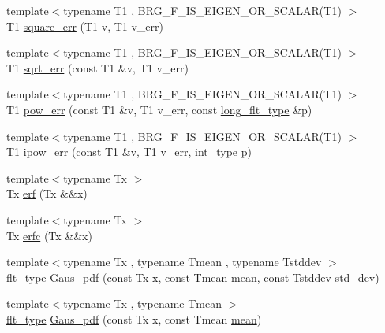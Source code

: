 \begin{DoxyCompactItemize}
{\footnotesize template$<$typename T1 , B\+R\+G\+\_\+\+F\+\_\+\+I\+S\+\_\+\+E\+I\+G\+E\+N\+\_\+\+O\+R\+\_\+\+S\+C\+A\+L\+A\+R(\+T1) $>$ }\\T1 \hyperlink{namespaceIceBRG_ae39a991d56ebe65d206807140a5389b4}{square\+\_\+err} (T1 v, T1 v\+\_\+err)
\item 
{\footnotesize template$<$typename T1 , B\+R\+G\+\_\+\+F\+\_\+\+I\+S\+\_\+\+E\+I\+G\+E\+N\+\_\+\+O\+R\+\_\+\+S\+C\+A\+L\+A\+R(\+T1) $>$ }\\T1 \hyperlink{namespaceIceBRG_a2f0a4e4c33a8437fab257f602f5f9b03}{sqrt\+\_\+err} (const T1 \&v, T1 v\+\_\+err)
\item 
{\footnotesize template$<$typename T1 , B\+R\+G\+\_\+\+F\+\_\+\+I\+S\+\_\+\+E\+I\+G\+E\+N\+\_\+\+O\+R\+\_\+\+S\+C\+A\+L\+A\+R(\+T1) $>$ }\\T1 \hyperlink{namespaceIceBRG_a2de650b0f4e004fd68bbba6414369d6a}{pow\+\_\+err} (const T1 \&v, T1 v\+\_\+err, const \hyperlink{lib_2IceBRG__main_2common_8h_a7040956e7e1b504d34a9ccfb4253bdce}{long\+\_\+flt\+\_\+type} \&p)
\item 
{\footnotesize template$<$typename T1 , B\+R\+G\+\_\+\+F\+\_\+\+I\+S\+\_\+\+E\+I\+G\+E\+N\+\_\+\+O\+R\+\_\+\+S\+C\+A\+L\+A\+R(\+T1) $>$ }\\T1 \hyperlink{namespaceIceBRG_a9c1dffeb9bad10147701507dcb91faf5}{ipow\+\_\+err} (const T1 \&v, T1 v\+\_\+err, \hyperlink{lib_2IceBRG__main_2common_8h_ac4de9d9335536ac22821171deec8d39e}{int\+\_\+type} p)
\item 
{\footnotesize template$<$typename Tx $>$ }\\Tx \hyperlink{namespaceIceBRG_a2928d6109d3a3e013f025bce4a9d1189}{erf} (Tx \&\&x)
\item 
{\footnotesize template$<$typename Tx $>$ }\\Tx \hyperlink{namespaceIceBRG_a9eb8301c8a38e4f1336c7de5623fd1db}{erfc} (Tx \&\&x)
\item 
{\footnotesize template$<$typename Tx , typename Tmean , typename Tstddev $>$ }\\\hyperlink{lib_2IceBRG__main_2common_8h_ad0f130a56eeb944d9ef2692ee881ecc4}{flt\+\_\+type} \hyperlink{namespaceIceBRG_a73cf4343d44ab035f5c003bcdf91512f}{Gaus\+\_\+pdf} (const Tx x, const Tmean \hyperlink{namespaceIceBRG_a31912d66a78938bcc3e0fdbc917c5eec}{mean}, const Tstddev std\+\_\+dev)
\item 
{\footnotesize template$<$typename Tx , typename Tmean $>$ }\\\hyperlink{lib_2IceBRG__main_2common_8h_ad0f130a56eeb944d9ef2692ee881ecc4}{flt\+\_\+type} \hyperlink{namespaceIceBRG_a89dab16190cfd407bbce8198ba2e47f1}{Gaus\+\_\+pdf} (const Tx x, const Tmean \hyperlink{namespaceIceBRG_a31912d66a78938bcc3e0fdbc917c5eec}{mean})

\end{DoxyCompactItemize}
